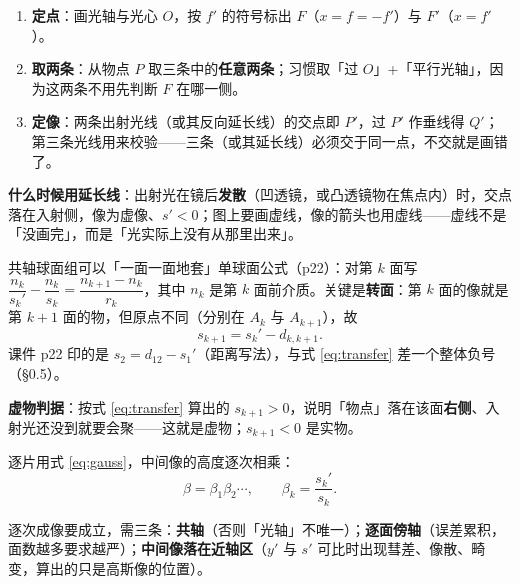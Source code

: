 \documentclass[11pt]{ctexart}
\begin{document}

\begin{enumerate}
  \item \textbf{定点}：画光轴与光心 $O$，按 $f'$ 的符号标出 $F$（$x=f=-f'$）与 $F'$（$x=f'$）。
  \item \textbf{取两条}：从物点 $P$ 取三条中的\textbf{任意两条}；习惯取「过 $O$」+「平行光轴」，因为这两条不用先判断 $F$ 在哪一侧。
  \item \textbf{定像}：两条出射光线（或其反向延长线）的交点即 $P'$，过 $P'$ 作垂线得 $Q'$；第三条光线用来校验——三条（或其延长线）必须交于同一点，不交就是画错了。
\end{enumerate}

\textbf{什么时候用延长线}：出射光在镜后\textbf{发散}（凹透镜，或凸透镜物在焦点内）时，交点落在入射侧，像为虚像、$s'<0$；图上要画虚线，像的箭头也用虚线——虚线不是「没画完」，而是「光实际上没有从那里出来」。



共轴球面组可以「一面一面地套」单球面公式（p22）：对第 $k$ 面写 $\dfrac{n_k}{s_k'}-\dfrac{n_k}{s_k}=\dfrac{n_{k+1}-n_k}{r_k}$，其中 $n_k$ 是第 $k$ 面前介质。关键是\textbf{转面}：第 $k$ 面的像就是第 $k+1$ 面的物，但原点不同（分别在 $A_k$ 与 $A_{k+1}$），故
\begin{equation}
s_{k+1}=s_k'-d_{k,k+1}.\label{eq:transfer}
\end{equation}
课件 p22 印的是 $s_2=d_{12}-s_1'$（距离写法），与式 \eqref{eq:transfer} 差一个整体负号（§0.5）。

\textbf{虚物判据}：按式 \eqref{eq:transfer} 算出的 $s_{k+1}>0$，说明「物点」落在该面\textbf{右侧}、入射光还没到就要会聚——这就是虚物；$s_{k+1}<0$ 是实物。


逐片用式 \eqref{eq:gauss}，中间像的高度逐次相乘：
\begin{equation}
\beta=\beta_1\beta_2\cdots,\qquad \beta_k=\frac{s_k'}{s_k}.\label{eq:betaN}
\end{equation}


逐次成像要成立，需三条：\textbf{共轴}（否则「光轴」不唯一）；\textbf{逐面傍轴}（误差累积，面数越多要求越严）；\textbf{中间像落在近轴区}（$y'$ 与 $s'$ 可比时出现彗差、像散、畸变，算出的只是高斯像的位置）。
\end{document}
